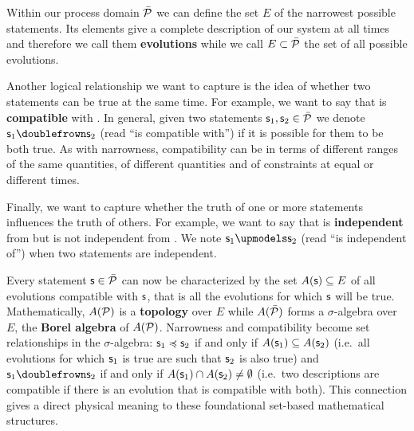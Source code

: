 \documentclass[letterpaper]{article}
\begin{document}
Within our process domain $\tdomain[P]$ we can define the set $E$ of the narrowest possible statements. Its elements give a complete description of our system at all times and therefore we call them \textbf{evolutions} while we call $E \subset \tdomain[P]$ the set of all possible evolutions.

Another logical relationship we want to capture is the idea of whether two statements can be true at the same time. For example, we want to say that  is \textbf{compatible} with . In general, given two statements $\stmt_1, \stmt_2 \in \tdomain[P]$ we denote $\stmt_1 \comp \stmt_2$ (read ``is compatible with'') if it is possible for them to be both true. As with narrowness, compatibility can be in terms of different ranges of the same quantities, of different quantities and of constraints at equal or different times.

Finally, we want to capture whether the truth of one or more statements influences the truth of others. For example, we want to say that  is \textbf{independent} from  but is not independent from . We note $\stmt_1 \indep \stmt_2$ (read ``is independent of'') when two statements are independent.

Every statement $\stmt \in \tdomain[P]$ can now be characterized by the set $A(\stmt) \subseteq E$ of all evolutions compatible with $\stmt$, that is all the evolutions for which $\stmt$ will be true. Mathematically,  $A(\edomain[P])$ is a \textbf{topology} over $E$ while $A(\tdomain[P])$ forms a $\sigma$-algebra over $E$, the \textbf{Borel algebra} of $A(\edomain[P])$. Narrowness and compatibility become set relationships in the $\sigma$-algebra: $\stmt_1 \narrower \stmt_2$ if and only if $A(\stmt_1) \subseteq A(\stmt_2)$ (i.e.~all evolutions for which $\stmt_1$ is true are such that $\stmt_2$ is also true) and $\stmt_1 \comp \stmt_2$ if and only if $A(\stmt_1) \cap A(\stmt_2) \neq \emptyset$ (i.e.~two descriptions are compatible if there is an evolution that is compatible with both). This connection gives a direct physical meaning to these foundational set-based mathematical structures.
\end{document}
